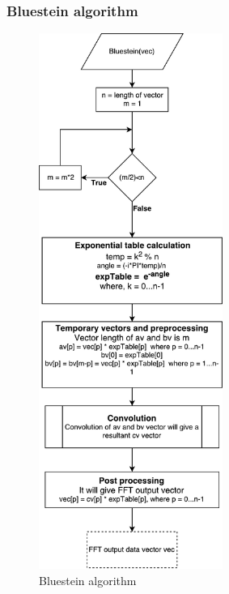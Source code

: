 \subsubsection{Bluestein algorithm}
\begin{figure}[h]
	\centering
	\includegraphics[width=6cm]{./algorithms/fft/figures/Bluestein.pdf}
	\caption{Bluestein algorithm}\label{Bluestein}
\end{figure}

\newpage
